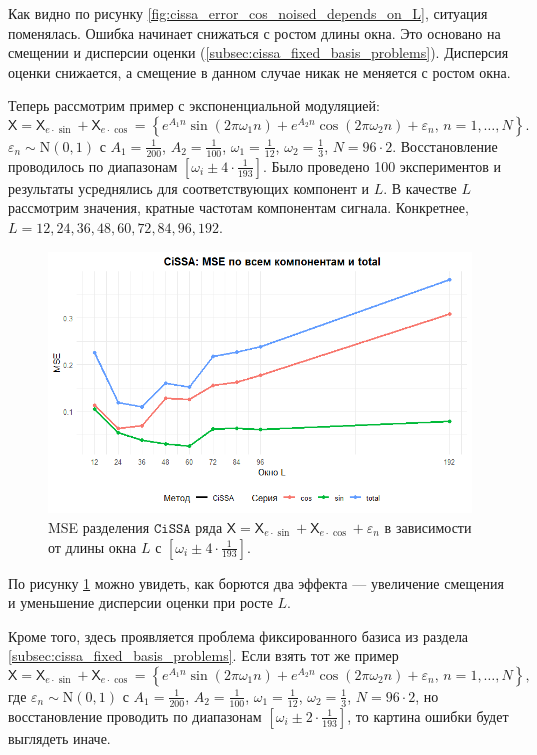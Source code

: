 \documentclass[12pt, specialist, subf
]{disser}
\theoremstyle{definition}
\newcommand{\CISSA}{\texttt{CiSSA}}
\newcommand{\TS}{\mathsf{X}}
\begin{document}
Как видно по рисунку \ref{fig:cissa_error_cos_noised_depends_on_L}, ситуация поменялась. Ошибка начинает снижаться с ростом длины окна. Это основано на смещении и дисперсии оценки (\ref{subsec:cissa_fixed_basis_problems}). Дисперсия оценки снижается, а смещение в данном случае никак не меняется с ростом окна.

Теперь рассмотрим пример с экспоненциальной модуляцией: 
\[ 
\TS = \TS_{e\cdot\sin} + \TS_{e\cdot\cos} = 
\left\{
	e^{A_1 n } \sin(2\pi \omega_1 n ) + e^{A_2 n} \cos(2\pi \omega_2 n ) + \varepsilon_n, \, n = 1, \dots, N 
\right\}.
\] 
 $\varepsilon_n \sim \mathrm N(0, 1)$ с $A_1 = \frac{1}{200}$, $A_2 = \frac{1}{100}$, $\omega_1 = \frac{1}{12}$, $\omega_2 = \frac{1}{3}$, $N = 96 \cdot 2$. Восстановление проводилось по диапазонам $[\omega_i \pm 4 \cdot \frac{1}{193}]$. Было проведено 100 экспериментов и результаты усреднялись для соответствующих компонент и $L$. В качестве $L$ рассмотрим значения, кратные частотам компонентам сигнала. Конкретнее,  $L = 12, 24, 36, 48, 60, 72, 84, 96, 192$.

\begin{figure}[H]
	\centering
	\includegraphics[width=1\textwidth]{img/cissa_errors_plot_expcos_noised.png}
	\caption{MSE разделения $\CISSA$ ряда $\TS = \TS_{e\cdot\sin} + \TS_{e\cdot\cos} + \varepsilon_n$ в зависимости от длины окна $L$ с $[\omega_i \pm 4 \cdot \frac{1}{193}]$.}
	\label{fig:cissa_error_expcos_noised_depends_on_L}
\end{figure}


По рисунку \ref{fig:cissa_error_expcos_noised_depends_on_L} можно увидеть, как борются два эффекта — увеличение смещения и уменьшение дисперсии оценки при росте $L$. 

Кроме того, здесь проявляется проблема фиксированного базиса из раздела \ref{subsec:cissa_fixed_basis_problems}. Если взять тот же пример \[ 
\TS = \TS_{e\cdot\sin} + \TS_{e\cdot\cos} = 
\left\{
	e^{A_1 n } \sin(2\pi \omega_1 n ) + e^{A_2 n} \cos(2\pi \omega_2 n ) + \varepsilon_n, \, n = 1, \dots, N 
\right\},
\] 
где 
 $\varepsilon_n \sim \mathrm N(0, 1)$ с $A_1 = \frac{1}{200}$, $A_2 = \frac{1}{100}$, $\omega_1 = \frac{1}{12}$, $\omega_2 = \frac{1}{3}$, $N = 96 \cdot 2$, но восстановление проводить по диапазонам $[\omega_i \pm 2 \cdot \frac{1}{193}]$, то картина ошибки будет выглядеть иначе.
\end{document}
